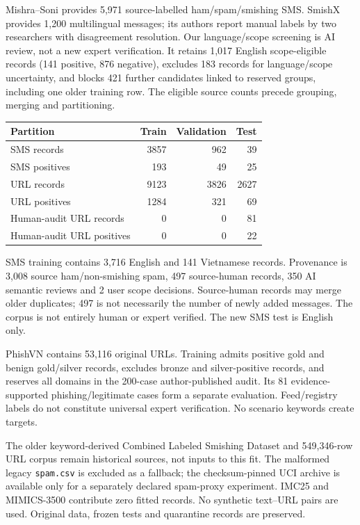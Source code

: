 \documentclass[11pt]{article}
\begin{document}
Mishra--Soni provides 5,971 source-labelled ham/spam/smishing SMS. SmishX provides
1,200 multilingual messages; its authors report manual labels by two researchers
with disagreement resolution. Our language/scope screening is AI review, not a new
expert verification. It retains 1,017 English scope-eligible records (141 positive,
876 negative), excludes 183 records for language/scope uncertainty, and blocks 421
further candidates linked to reserved groups, including one older training row.
The eligible source counts precede grouping, merging and partitioning.

\begin{center}
\begin{tabular}{lrrr}
\toprule
Partition & Train & Validation & Test\\
\midrule
SMS records & 3857 & 962 & 39\\
SMS positives & 193 & 49 & 25\\
URL records & 9123 & 3826 & 2627\\
URL positives & 1284 & 321 & 69\\
Human-audit URL records & 0 & 0 & 81\\
Human-audit URL positives & 0 & 0 & 22\\
\bottomrule
\end{tabular}
\end{center}

SMS training contains 3,716 English and 141 Vietnamese records. Provenance is
3,008 source ham/non-smishing spam, 497 source-human records, 350 AI semantic
reviews and 2 user scope decisions. Source-human records may merge older duplicates;
497 is not necessarily the number of newly added messages. The corpus is not
entirely human or expert verified. The new SMS test is English only.

PhishVN contains 53,116 original URLs. Training admits positive gold and benign
gold/silver records, excludes bronze and silver-positive records, and reserves
all domains in the 200-case author-published audit. Its 81 evidence-supported
phishing/legitimate cases form a separate evaluation. Feed/registry labels do not
constitute universal expert verification. No scenario keywords create targets.

The older keyword-derived Combined Labeled Smishing Dataset and 549,346-row URL
corpus remain historical sources, not inputs to this fit. The malformed legacy
\texttt{spam.csv} is excluded as a fallback; the checksum-pinned UCI archive is
available only for a separately declared spam-proxy experiment. IMC25 and
MIMICS-3500 contribute zero fitted records. No synthetic text--URL pairs are used.
Original data, frozen tests and quarantine records are preserved.
\end{document}
